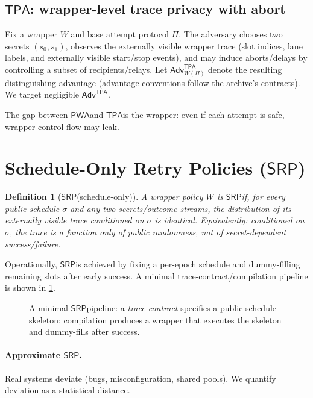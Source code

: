 \documentclass[11pt]{article}
\newtheorem{definition}{Definition}
\newcommand{\Adv}{\ensuremath{\mathsf{Adv}}}
\newcommand{\PWA}{\ensuremath{\mathsf{PWA}}}
\newcommand{\TPA}{\ensuremath{\mathsf{TPA}}}
\newcommand{\SRP}{\ensuremath{\mathsf{SRP}}}
\begin{document}
\subsection{\texorpdfstring{\TPA}{TPA}: wrapper-level trace privacy with abort}
Fix a wrapper $W$ and base attempt protocol $\Pi$.
The adversary chooses two secrets $(s_0,s_1)$, observes the externally visible wrapper trace
(slot indices, lane labels, and externally visible start/stop events), and may induce aborts/delays by controlling a subset of recipients/relays.
Let $\Adv^{\TPA}_{W(\Pi)}$ denote the resulting distinguishing advantage (advantage conventions follow the archive's contracts).\cite{series:advantagecontracts}
We target negligible $\Adv^{\TPA}$.

The gap between \PWA and \TPA is the wrapper: even if each attempt is safe, wrapper control flow may leak.

\section{Schedule-Only Retry Policies (\texorpdfstring{\SRP}{SRP})}
\begin{definition}[\SRP (schedule-only)]
A wrapper policy $W$ is \SRP if, for every public schedule $\sigma$ and any two secrets/outcome streams,
the distribution of its externally visible trace \emph{conditioned on $\sigma$} is identical.
Equivalently: conditioned on $\sigma$, the trace is a function only of public randomness, not of secret-dependent success/failure.
\end{definition}

Operationally, \SRP is achieved by fixing a per-epoch schedule and dummy-filling remaining slots after early success.
A minimal trace-contract/compilation pipeline is shown in \cref{fig:contract}.

\begin{figure}[t]
  \centering
  \caption{A minimal \SRP pipeline: a \emph{trace contract} specifies a public schedule skeleton; compilation produces a wrapper that executes the skeleton and dummy-fills after success.}
  \label{fig:contract}
\end{figure}

\paragraph{Approximate \SRP.}
Real systems deviate (bugs, misconfiguration, shared pools). We quantify deviation as a statistical distance.
\end{document}
